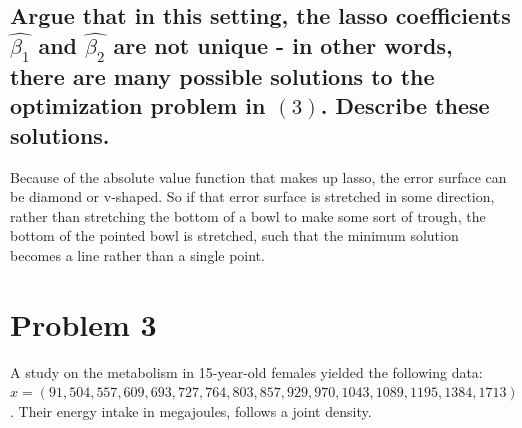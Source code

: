 \documentclass[20pt]{article} %
\begin{document}
\subsection{Argue that in this setting, the lasso coefficients $\hat{\beta_1}$ and $\hat{\beta_2}$ are not unique - in other words, there are many possible solutions to the optimization problem in $(3)$. Describe these solutions.}
Because of the absolute value function that makes up lasso, the error surface can be diamond or v-shaped.  So if that error surface is stretched in some direction, rather than stretching the bottom of a bowl to make some sort of trough, the bottom of the pointed bowl is stretched, such that the minimum solution becomes a line rather than a single point.

\section{Problem 3}
A study on the metabolism in 15-year-old females yielded the following data: \\
$x = (91, 504, 557, 609, 693, 727, 764, 803, 857, 929, 970, 1043, 1089, 1195, 1384, 1713)$.  Their energy intake in megajoules, follows a joint density.
\end{document}
